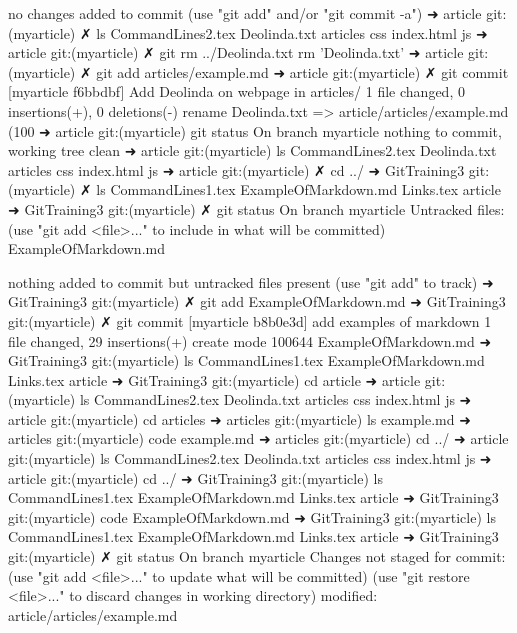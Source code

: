 no changes added to commit (use "git add" and/or "git commit -a")
➜  article git:(myarticle) ✗ ls      
CommandLines2.tex Deolinda.txt      articles          css               index.html        js
➜  article git:(myarticle) ✗ git rm ../Deolinda.txt
rm 'Deolinda.txt'
➜  article git:(myarticle) ✗ git add articles/example.md 
➜  article git:(myarticle) ✗ git commit
[myarticle f6bbdbf] Add Deolinda on webpage in articles/
 1 file changed, 0 insertions(+), 0 deletions(-)
 rename Deolinda.txt => article/articles/example.md (100%
➜  article git:(myarticle) git status
On branch myarticle
nothing to commit, working tree clean
➜  article git:(myarticle) ls
CommandLines2.tex Deolinda.txt      articles          css               index.html        js
➜  article git:(myarticle) ✗ cd ../
➜  GitTraining3 git:(myarticle) ✗ ls
CommandLines1.tex    ExampleOfMarkdown.md Links.tex            article
➜  GitTraining3 git:(myarticle) ✗ git status
On branch myarticle
Untracked files:
  (use "git add <file>..." to include in what will be committed)
	ExampleOfMarkdown.md

nothing added to commit but untracked files present (use "git add" to track)
➜  GitTraining3 git:(myarticle) ✗ git add ExampleOfMarkdown.md 
➜  GitTraining3 git:(myarticle) ✗ git commit
[myarticle b8b0e3d] add examples of markdown
 1 file changed, 29 insertions(+)
 create mode 100644 ExampleOfMarkdown.md
➜  GitTraining3 git:(myarticle) ls
CommandLines1.tex    ExampleOfMarkdown.md Links.tex            article
➜  GitTraining3 git:(myarticle) cd article 
➜  article git:(myarticle) ls
CommandLines2.tex Deolinda.txt      articles          css               index.html        js
➜  article git:(myarticle) cd articles 
➜  articles git:(myarticle) ls
example.md
➜  articles git:(myarticle) code example.md 
➜  articles git:(myarticle) cd ../
➜  article git:(myarticle) ls
CommandLines2.tex Deolinda.txt      articles          css               index.html        js
➜  article git:(myarticle) cd ../
➜  GitTraining3 git:(myarticle) ls
CommandLines1.tex    ExampleOfMarkdown.md Links.tex            article
➜  GitTraining3 git:(myarticle) code ExampleOfMarkdown.md 
➜  GitTraining3 git:(myarticle) ls
CommandLines1.tex    ExampleOfMarkdown.md Links.tex            article
➜  GitTraining3 git:(myarticle) ✗ git status
On branch myarticle
Changes not staged for commit:
  (use "git add <file>..." to update what will be committed)
  (use "git restore <file>..." to discard changes in working directory)
	modified:   article/articles/example.md

